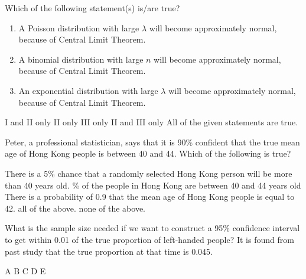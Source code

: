 \documentclass[letterpaper,10pt,addpoints]{exam}
\begin{document}
\begin{questions}
  \question Which of the following statement(s) is/are true?
  \begin{enumerate}[I]
    \item A Poisson distribution with large $\lambda$ will become approximately normal, because of Central Limit Theorem.
    \item A binomial distribution with large $n$ will become approximately normal, because of Central Limit Theorem.
    \item An exponential distribution with large $\lambda$ will become approximately normal, because of Central Limit Theorem.
  \end{enumerate}
  \begin{choices}
    \correctchoice I and II only
    \choice II only
    \choice III only
    \choice II and III only
    \choice All of the given statements are true.
    \end{choices}

\question Peter, a professional statistician, says that it is 90\% confident that the true mean age of Hong Kong people is between 40 and 44. Which of the following is true?
\begin{choices}
  \choice There is a 5\% chance that a randomly selected Hong Kong person will be more than 40 years old.
  \% of the people in Hong Kong are between 40 and 44 years old
  \choice There is a probability of 0.9 that the mean age of Hong Kong people is equal to 42.
  \choice all of the above.
  \correctchoice none of the above.
\end{choices}


\question What is the sample size needed if we want to construct a 95\% confidence interval to get within 0.01 of the true proportion of left-handed people? It is found from past study that the true proportion at that time is 0.045.
\begin{choices}
  \choice A
  \choice B
  \choice C
  \choice D
  \choice E
\end{choices}



\end{questions}
\end{document}
